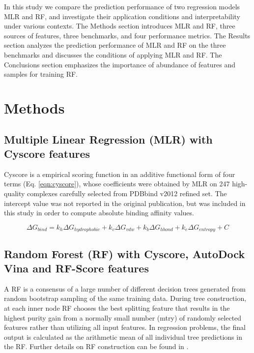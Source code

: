\documentclass[journal=jacsat,manuscript=article]{achemso}
\begin{document}
In this study we compare the prediction performance of two regression models MLR and RF, and investigate their application conditions and interpretability under various contexts. The Methods section introduces MLR and RF, three sources of features, three benchmarks, and four performance metrics. The Results section analyzes the prediction performance of MLR and RF on the three benchmarks and discusses the conditions of applying MLR and RF. The Conclusions section emphasizes the importance of abundance of features and samples for training RF.

\section{Methods}

\subsection{Multiple Linear Regression (MLR) with Cyscore features}

Cyscore is a empirical scoring function in an additive functional form of four terms (Eq. \ref{eqn:cyscore}), whose coefficients were obtained by MLR on 247 high-quality complexes carefully selected from PDBbind v2012 refined set. The intercept value was not reported in the original publication, but was included in this study in order to compute absolute binding affinity values.

\begin{equation}
\Delta G_{bind} = k_h\Delta G_{hydrophobic} + k_v\Delta G_{vdw} + k_b\Delta G_{hbond} + k_e\Delta G_{entropy} + C
\label{eqn:cyscore}
\end{equation}

\subsection{Random Forest (RF) with Cyscore, AutoDock Vina and RF-Score features}

A RF \cite{1309} is a consensus of a large number of different decision trees generated from random bootstrap sampling of the same training data. During tree construction, at each inner node RF chooses the best splitting feature that results in the highest purity gain from a normally small number (mtry) of randomly selected features rather than utilizing all input features. In regression problems, the final output is calculated as the arithmetic mean of all individual tree predictions in the RF. Further details on RF construction can be found in \cite{564,1362}.
\end{document}
